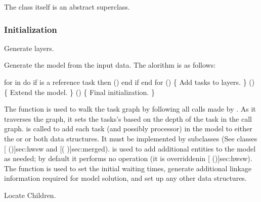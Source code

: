 The class  itself is an abstract superclass.

\subsubsection{Initialization}
\begin{description}

\label{sec:layerize-generate}
\item[generate] \texonly{---} Generate layers.\\

Generate the model from the input data.  The alorithm is as follows:

\begin{example}
  for  in  do
    if  is a reference task then
      ()
    end if
  end for
  ()   \{ Add tasks to layers. \}
  ()       \{ Extend the model. \}
  ()   \{ Final initialization. \}
\end{example}

The function  is used to walk the task graph by
following all calls made by .  As it traverses the graph,
it sets the tasks's  based on the
depth of the task in the call graph.   is called to
add each task (and possibly processor) in the model to either the
 or  or both data structures.  It must be
implemented by subclasses (See classes [
(\Sec\Ref)]{sec:hwsw} and [(
\Sec\Ref)]{sec:merged}).   is used to add additional
entities to the model as needed; by default it performs no operation
(it is overriddenin [
(\Sec\Ref)]{sec:hwsw}).  The function
 is used to set the
initial waiting times, generate additional linkage information
required for model solution, and set up any other data structures.

\label{sec:layerize-findChildren}
\item[findChildren] \texonly{---} Locate Children.\\


\end{description}
